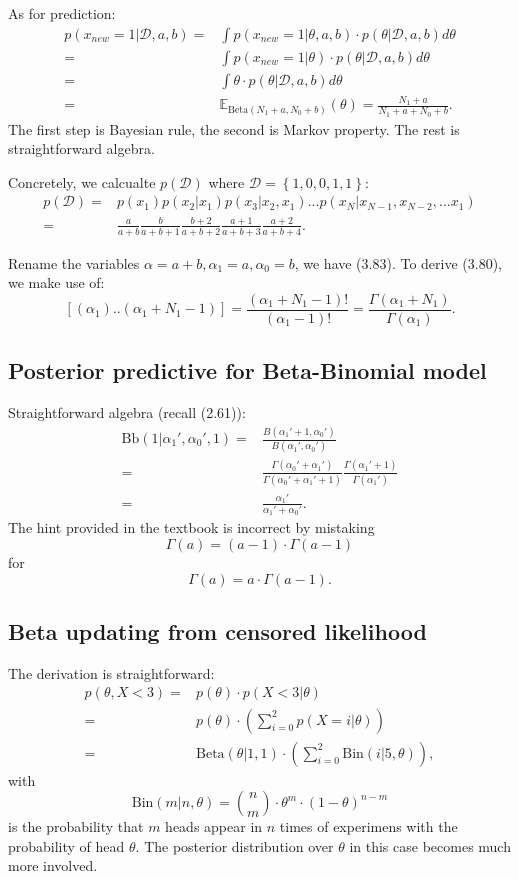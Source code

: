 \documentclass[UTF8]{ctexart}
\begin{document}
As for prediction:
$$
\begin{aligned}
p(x_{new}=1|\mathcal{D},a,b)=&\int p(x_{new}=1|\theta,a,b)\cdot p(\theta|\mathcal{D},a,b) d\theta \\
=&\int p(x_{new}=1|\theta)\cdot p(\theta|\mathcal{D},a,b) d\theta \\
=&\int \theta\cdot p(\theta|\mathcal{D},a,b) d\theta \\
=& \mathbb{E}_{\text{Beta}(N_{1}+a,N_{0}+b)}(\theta) = \frac{N_{1}+a}{N_{1}+a+N_{0}+b}.
\end{aligned}
$$
The first step is Bayesian rule, the second is Markov property.
The rest is straightforward algebra.

Concretely, we calcualte $p(\mathcal{D})$ where $\mathcal{D}=\left\{1,0,0,1,1\right\}$:
\begin{align}
p(\mathcal{D})=&p(x_{1})p(x_{2}|x_{1})p(x_{3}|x_{2},x_{1})...p(x_{N}|x_{N-1},x_{N-2},...x_{1})\nonumber \\
=&\frac{a}{a+b}\frac{b}{a+b+1}\frac{b+2}{a+b+2}\frac{a+1}{a+b+3}\frac{a+2}{a+b+4}. \nonumber
\end{align}


Rename the variables $\alpha=a+b,\alpha_{1}=a,\alpha_{0}=b$, we have (3.83). To derive (3.80), we make use of:
$$[(\alpha_{1})..(\alpha_{1}+N_{1}-1)] = \frac{(\alpha_{1}+N_{1}-1)!}{(\alpha_{1}-1)!}=\frac{\Gamma(\alpha_{1}+N_{1})}{\Gamma(\alpha_{1})}.$$

\subsection{Posterior predictive for Beta-Binomial model}
Straightforward algebra (recall (2.61)):
\begin{align}
\text{Bb}(1|\alpha_{1}',\alpha_{0}',1)=&\frac{B(\alpha_{1}'+1,\alpha_{0}')}{B(\alpha_{1}',\alpha_{0}')} \nonumber \\
=&\frac{\Gamma(\alpha_{0}'+\alpha_{1}')}{\Gamma(\alpha_{0}'+\alpha_{1}'+1)}\frac{\Gamma(\alpha_{1}'+1)}{\Gamma(\alpha_{1}')} \nonumber \\
=&\frac{\alpha_{1}'}{\alpha_{1}'+\alpha_{0}'}. \nonumber
\end{align}
The hint provided in the textbook is incorrect by mistaking
$$\Gamma(a)=(a-1)\cdot\Gamma(a-1)$$
for
$$\Gamma(a)=a\cdot\Gamma(a-1).$$


\subsection{Beta updating from censored likelihood}
The derivation is straightforward:
$$
\begin{aligned}
p(\theta,X < 3) =& p(\theta)\cdot p(X < 3| \theta) \\
=& p(\theta)\cdot \left(\sum_{i=0}^{2}p(X=i|\theta)\right) \\
=&\text{Beta}(\theta|1,1)\cdot \left(\sum_{i=0}^{2}\text{Bin}(i|5,\theta)\right),
\end{aligned}
$$
with
$$\text{Bin}(m|n,\theta)=\binom{n}{m}\cdot \theta^{m}\cdot(1-\theta)^{n-m}$$
is the probability that $m$ heads appear in $n$ times of experimens with the probability of head $\theta$.
The posterior distribution over $\theta$ in this case becomes much more involved.
\end{document}
